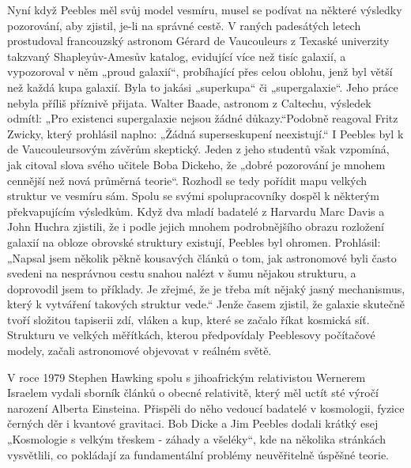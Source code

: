   Nyní když Peebles měl svůj model vesmíru, musel se podívat na některé výsledky pozorování, aby
  zjistil, je-li na správné cestě. V raných padesátých letech prostudoval francouzský astronom
  Gérard de Vaucouleurs z Texaské univerzity takzvaný Shapleyův-Amesův katalog, evidující více než
  tisíc galaxií, a vypozoroval v něm „proud galaxií“, probíhající přes celou oblohu, jenž byl větší
  než každá kupa galaxií. Byla to jakási „superkupa“ či „supergalaxie“. Jeho práce nebyla příliš
  příznivě přijata. Walter Baade, astronom z Caltechu, výsledek odmítl: „Pro existenci supergalaxie
  nejsou žádné důkazy.“Podobně reagoval Fritz Zwicky, který prohlásil naplno: „Žádná superseskupení
  neexistují.“ I Peebles byl k de Vaucouleursovým závěrům skeptický. Jeden z jeho studentů však
  vzpomíná, jak citoval slova svého učitele Boba Dickeho, že „dobré pozorování je mnohem cennější
  než nová průměrná teorie“. Rozhodl se tedy pořídit mapu velkých struktur ve vesmíru sám. Spolu se
  svými spolupracovníky dospěl k některým překvapujícím výsledkům. Když dva mladí badatelé z
  Harvardu Marc Davis a John Huchra zjistili, že i podle jejich mnohem podrobnějšího obrazu
  rozložení galaxií na obloze obrovské struktury existují, Peebles byl ohromen. Prohlásil: „Napsal
  jsem několik pěkně kousavých článků o tom, jak astronomové byli často svedeni na nesprávnou cestu
  snahou nalézt v šumu nějakou strukturu, a doprovodil jsem to příklady. Je zřejmé, že je třeba mít
  nějaký jasný mechanismus, který k vytváření takových struktur vede.“ Jenže časem zjistil, že
  galaxie skutečně tvoří složitou tapiserii zdí, vláken a kup, které se začalo říkat kosmická síť.
  Strukturu ve velkých měřítkách, kterou předpovídaly Peeblesovy počítačové modely, začali
  astronomové objevovat v reálném světě. 
  
  V roce 1979 Stephen Hawking spolu s jihoafrickým relativistou Wernerem Israelem vydali sborník
  článků o obecné relativitě, který měl uctít sté výročí narození Alberta Einsteina. Přispěli do
  něho vedoucí badatelé v kosmologii, fyzice černých děr i kvantové gravitaci. Bob Dicke a Jim
  Peebles dodali krátký esej „Kosmologie s velkým třeskem - záhady a všeléky“, kde na několika
  stránkách vysvětlili, co pokládají za fundamentální problémy neuvěřitelně úspěšné teorie. 
  
